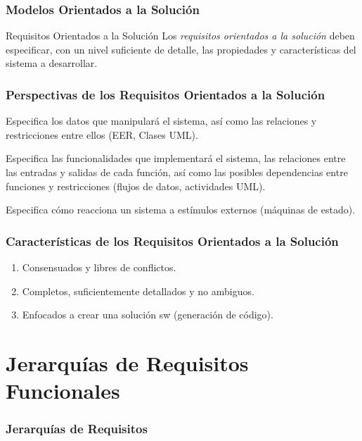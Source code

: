 \documentclass[handout,slidestop,xcolor=pst,dvips,blue]{beamer}
\begin{document}
\begin{frame}[c]
    \frametitle{Modelos Orientados a la Solución}
    \begin{block}{Requisitos Orientados a la Solución}
        Los \emph{requisitos orientados a la solución} deben especificar, con un nivel suficiente de detalle, las propiedades y características del sistema a desarrollar.
    \end{block}
\end{frame}

\begin{frame}[c]
    \frametitle{Perspectivas de los Requisitos Orientados a la Solución}
    \begin{description}[<+->]
        \item[Datos] Especifica los datos que manipulará el sistema, así como las relaciones y restricciones entre ellos (EER, Clases UML).
        \item[Funcional] Especifica las funcionalidades que implementará el sistema, las relaciones entre las entradas y salidas de cada función, así como las posibles dependencias entre funciones y restricciones (flujos de datos, actividades UML).
        \item[Comportamiento] Especifica cómo reacciona un sistema a estímulos externos (máquinas de estado).
    \end{description}
\end{frame}

\begin{frame}[c]
    \frametitle{Características de los Requisitos Orientados a la Solución}
    \begin{enumerate}[<+->]
        \item Consensuados y libres de conflictos.
        \item Completos, suficientemente detallados y no ambiguos.
        \item Enfocados a crear una solución sw (generación de código).
    \end{enumerate}
\end{frame}

\section{Jerarquías de Requisitos Funcionales}

\begin{frame}
    \frametitle{Jerarquías de Requisitos}
\end{frame}
\end{document}
